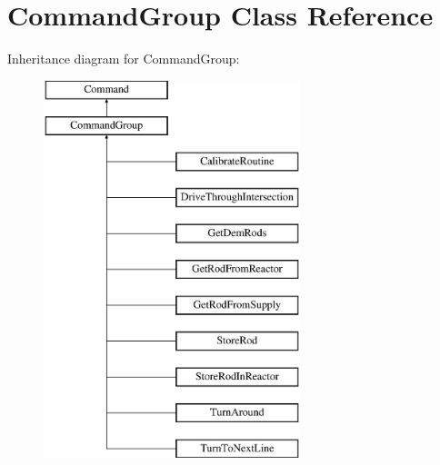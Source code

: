 \hypertarget{classCommandGroup}{\section{Command\-Group Class Reference}
\label{classCommandGroup}
}
Inheritance diagram for Command\-Group\-:\begin{figure}[H]
\begin{center}
\leavevmode
\includegraphics[height=11.000000cm]{classCommandGroup}
\end{center}
\end{figure}
